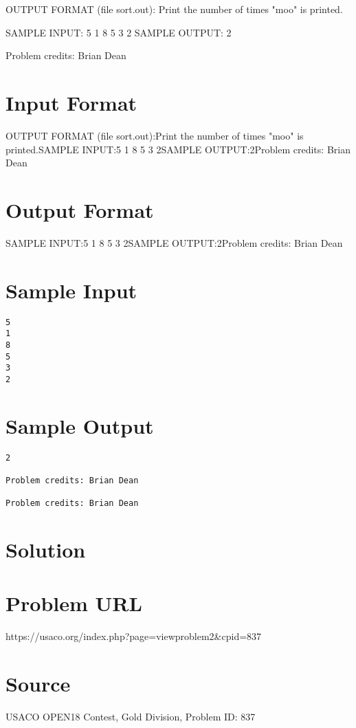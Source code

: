 \documentclass[12pt]{article}
\begin{document}
OUTPUT FORMAT (file sort.out):
Print the number of times "moo" is printed.

SAMPLE INPUT:
5
1
8
5
3
2
SAMPLE OUTPUT: 
2


Problem credits: Brian Dean



\section*{Input Format}
OUTPUT FORMAT (file sort.out):Print the number of times "moo" is printed.SAMPLE INPUT:5
1
8
5
3
2SAMPLE OUTPUT:2Problem credits: Brian Dean

\section*{Output Format}
SAMPLE INPUT:5
1
8
5
3
2SAMPLE OUTPUT:2Problem credits: Brian Dean

\section*{Sample Input}
\begin{verbatim}
5
1
8
5
3
2
\end{verbatim}

\section*{Sample Output}
\begin{verbatim}
2

Problem credits: Brian Dean

Problem credits: Brian Dean
\end{verbatim}

\section*{Solution}


\section*{Problem URL}
https://usaco.org/index.php?page=viewproblem2&cpid=837

\section*{Source}
USACO OPEN18 Contest, Gold Division, Problem ID: 837
\end{document}
